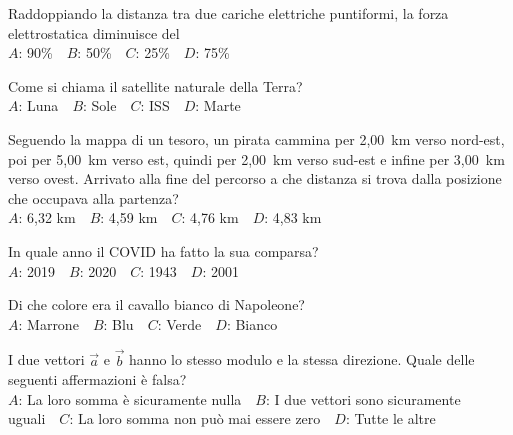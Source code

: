 \mcquestionfooter



\def\mcquestionnumber{11}


\mcquestionheader Raddoppiando la distanza tra due cariche elettriche puntiformi, la forza elettrostatica diminuisce del\\
{$A$}: 90\%\ \ {$B$}: 50\%\ \ {$C$}: 25\%\ \ {$D$}: 75\%\ \ 

\mcquestionfooter



\def\mcquestionnumber{12}


\mcquestionheader Come si chiama il satellite naturale della Terra?\\
{$A$}: Luna\ \ {$B$}: Sole\ \ {$C$}: ISS\ \ {$D$}: Marte\ \ 

\mcquestionfooter



\mcpaperfooter

\def\mcserialnumber{20}
\mcpaperheader


\def\mcquestionnumber{1}


\mcquestionheader Seguendo la mappa di un tesoro, un pirata cammina per 2,00~km verso nord-est, poi per 5,00~km verso est, quindi per 2,00~km verso sud-est e infine per 3,00~km verso ovest. Arrivato alla fine del percorso a che distanza si trova dalla posizione che occupava alla partenza?\\
{$A$}: 6,32 km\ \ {$B$}: 4,59 km\ \ {$C$}: 4,76 km\ \ {$D$}: 4,83 km\ \ 

\mcquestionfooter



\def\mcquestionnumber{2}


\mcquestionheader In quale anno il COVID ha fatto la sua comparsa?\\
{$A$}: 2019\ \ {$B$}: 2020\ \ {$C$}: 1943\ \ {$D$}: 2001\ \ 

\mcquestionfooter



\def\mcquestionnumber{3}


\mcquestionheader Di che colore era il cavallo bianco di Napoleone?\\
{$A$}: Marrone\ \ {$B$}: Blu\ \ {$C$}: Verde\ \ {$D$}: Bianco\ \ 

\mcquestionfooter



\def\mcquestionnumber{4}


\mcquestionheader I due vettori $\vec{a}$ e $\vec{b}$ hanno lo stesso modulo e la stessa direzione. Quale delle seguenti affermazioni è falsa?\\
{$A$}: La loro somma è sicuramente nulla\ \ {$B$}: I due vettori sono sicuramente uguali\ \ {$C$}: La loro somma non può mai essere zero\ \ {$D$}: Tutte le altre\ \ 

